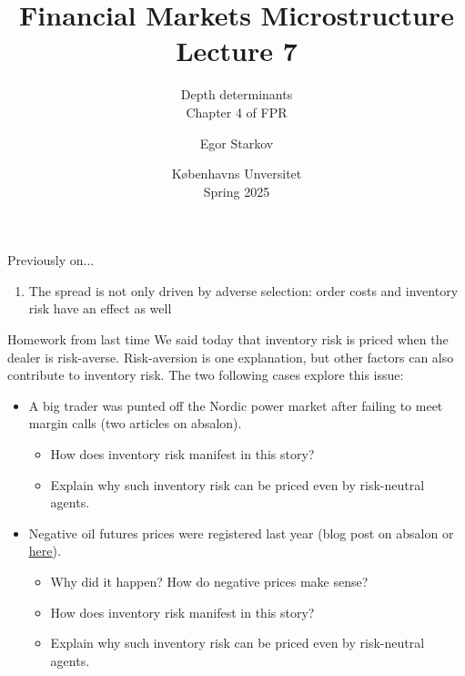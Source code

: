 \documentclass[english,10pt
,aspectratio=169
]{beamer}
\title{Financial Markets Microstructure \\ Lecture 7}
\subtitle{Depth determinants \\ %
	Chapter 4 of FPR}
\author{Egor Starkov}
\date{K{\o}benhavns Unversitet \\
	Spring 2025}
\begin{document}
	

\frame[plain]{\titlepage}


\begin{frame}{Previously on...}
	\begin{enumerate}
		\item The spread is not only driven by adverse selection: order costs and inventory risk have an effect as well
	\end{enumerate}
\end{frame}


\begin{frame}{Homework from last time}
	We said today that inventory risk is priced when the dealer is risk-averse. Risk-aversion is one explanation, but other factors can also contribute to inventory risk.
	The two following cases explore this issue:
	\begin{itemize}
		\item A big trader was punted off the Nordic power market after failing to meet margin calls (two articles on absalon).
		\begin{itemize}
			\item How does inventory risk manifest in this story?
			\item Explain why such inventory risk can be priced even by risk-neutral agents.
		\end{itemize}
		\item Negative oil futures prices were registered last year (blog post on absalon or \href{https://streetwiseprofessor.com/wti-wtf/}{\uline{here}}).
		\begin{itemize}
			\item Why did it happen? How do negative prices make sense?
			\item How does inventory risk manifest in this story?
			\item Explain why such inventory risk can be priced even by risk-neutral agents.
		\end{itemize}
	\end{itemize}
\end{frame}
\end{document}
